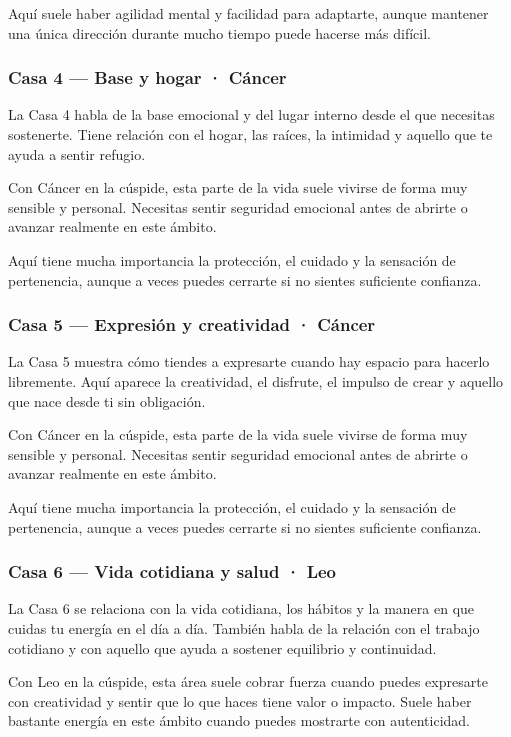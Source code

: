 \documentclass[11pt,a4paper]{article}
\begin{document}
Aquí suele haber agilidad mental y facilidad para adaptarte, aunque mantener una única dirección durante mucho tiempo puede hacerse más difícil.

\subsubsection*{Casa 4 — Base y hogar · Cáncer}
La Casa 4 habla de la base emocional y del lugar interno desde el que necesitas sostenerte. Tiene relación con el hogar, las raíces, la intimidad y aquello que te ayuda a sentir refugio.

Con Cáncer en la cúspide, esta parte de la vida suele vivirse de forma muy sensible y personal. Necesitas sentir seguridad emocional antes de abrirte o avanzar realmente en este ámbito.

Aquí tiene mucha importancia la protección, el cuidado y la sensación de pertenencia, aunque a veces puedes cerrarte si no sientes suficiente confianza.

\subsubsection*{Casa 5 — Expresión y creatividad · Cáncer}
La Casa 5 muestra cómo tiendes a expresarte cuando hay espacio para hacerlo libremente. Aquí aparece la creatividad, el disfrute, el impulso de crear y aquello que nace desde ti sin obligación.

Con Cáncer en la cúspide, esta parte de la vida suele vivirse de forma muy sensible y personal. Necesitas sentir seguridad emocional antes de abrirte o avanzar realmente en este ámbito.

Aquí tiene mucha importancia la protección, el cuidado y la sensación de pertenencia, aunque a veces puedes cerrarte si no sientes suficiente confianza.

\subsubsection*{Casa 6 — Vida cotidiana y salud · Leo}
La Casa 6 se relaciona con la vida cotidiana, los hábitos y la manera en que cuidas tu energía en el día a día. También habla de la relación con el trabajo cotidiano y con aquello que ayuda a sostener equilibrio y continuidad.

Con Leo en la cúspide, esta área suele cobrar fuerza cuando puedes expresarte con creatividad y sentir que lo que haces tiene valor o impacto. Suele haber bastante energía en este ámbito cuando puedes mostrarte con autenticidad.
\end{document}
